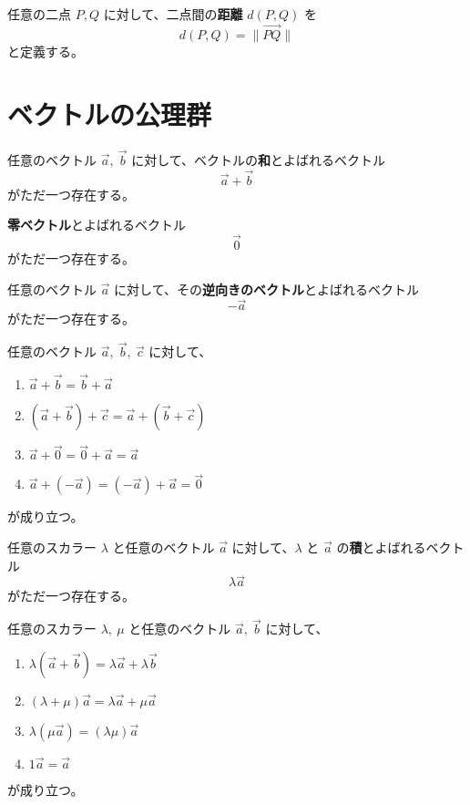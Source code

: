 \begin{dfn}[距離]\label{definition:18}
  任意の二点 \(P,Q\) に対して、二点間の\textbf{距離} \(d(P,Q)\) を
  \[d(P,Q)=\|\overrightarrow{PQ}\|\]
  と定義する。
\end{dfn}

\section{ベクトルの公理群}

\begin{axm}\label{axiom:1}
  任意のベクトル \(\vec{a},\ \vec{b}\) に対して、ベクトルの\textbf{和}とよばれるベクトル
  \[\vec{a}+\vec{b}\]
  がただ一つ存在する。
\end{axm}

\begin{axm}\label{axiom:2}
  \textbf{零ベクトル}とよばれるベクトル
  \[\vec{0}\]
  がただ一つ存在する。
\end{axm}

\begin{axm}\label{axiom:3}
  任意のベクトル \(\vec{a}\) に対して、その\textbf{逆向きのベクトル}とよばれるベクトル
  \[-\vec{a}\]
  がただ一つ存在する。
\end{axm}

\begin{axm}\label{axiom:4}
  任意のベクトル \(\vec{a},\ \vec{b},\ \vec{c}\) に対して、
  \begin{enumerate}
    \item \(\vec{a}+\vec{b}=\vec{b}+\vec{a}\)
    \item \((\vec{a}+\vec{b})+\vec{c}=\vec{a}+(\vec{b}+\vec{c})\)
    \item \(\vec{a}+\vec{0}=\vec{0}+\vec{a}=\vec{a}\)
    \item \(\vec{a}+(-\vec{a})=(-\vec{a})+\vec{a}=\vec{0}\)
  \end{enumerate}
  が成り立つ。
\end{axm}

\begin{axm}\label{axiom:5}
  任意のスカラー \(\lambda\) と任意のベクトル \(\vec{a}\) に対して、\(\lambda\) と \(\vec{a}\) の\textbf{積}とよばれるベクトル
  \[\lambda\vec{a}\]
  がただ一つ存在する。
\end{axm}

\begin{axm}\label{axiom:6}
  任意のスカラー \(\lambda,\ \mu\) と任意のベクトル \(\vec{a},\ \vec{b}\) に対して、
  \begin{enumerate}
    \item \(\lambda(\vec{a}+\vec{b})=\lambda\vec{a}+\lambda\vec{b}\)
    \item \((\lambda+\mu)\vec{a}=\lambda\vec{a}+\mu\vec{a}\)
    \item \(\lambda(\mu\vec{a})=(\lambda\mu)\vec{a}\)
    \item \(1\vec{a}=\vec{a}\)
  \end{enumerate}
  が成り立つ。
\end{axm}

